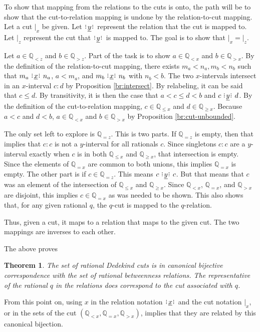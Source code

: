\documentclass[12pt]{article}
\newtheorem{theorem}{Theorem}
\newcommand{\qcut}[2][x]{\ensuremath{\mathbb{Q}_{#2 #1}}}
\newcommand{\qlt}[1][x]{\qcut[#1]{<}}
\newcommand{\qeq}[1][x]{\qcut[#1]{=}}
\newcommand{\qgt}[1][x]{\qcut[#1]{>}}
\newcommand{\qgeq}[1][x]{\qcut[#1]{\geq}}
\newcommand{\qleq}[1][x]{\qcut[#1]{\leq}}
\newcommand{\cut}[1][x]{{\vert}_{#1} }
\newcommand{\yrel}{\xrel[y]}
\begin{document}
To show that mapping from the relations to the cuts is onto, the path will be to show that the cut-to-relation mapping is undone by the relation-to-cut mapping. Let a cut $\cut$ be given. Let $\yrel$ represent the relation that the cut is mapped to. Let $\cut[z]$ represent the cut that $\yrel$ is mapped to. The goal is to show that $\cut = \cut[z]$.  

Let $a \in \qlt[z]$ and $b \in \qgt[z]$. Part of the task is to show $a \in \qlt$ and $b \in \qgt$. By the definition of the relation-to-cut mapping, there exists $m_a < n_a, m_b < n_b$ such that $m_a \xrel n_a$, $a < m_a$, and $m_b \xrel n_b$ with $n_b < b$. The two $x$-intervals intersect in an $x$-interval $c:d$ by  Proposition \ref{br:intersect}. By relabeling, it can be said that $c \leq d$. By transitivity, it is then the case that $a < c \leq d < b$ and $c \yrel d$. By the definition of the cut-to-relation mapping, $c \in \qleq$ and $d \in \qgeq$. Because $a < c$ and $ d < b$, $a \in \qlt$ and $b \in \qgt$ by Proposition \ref{br:cut-unbounded}.

The only set left to explore is $\qeq[z]$. This is two parts. If $\qeq[z]$ is empty, then that implies that $c:c$ is not a $y$-interval for all rationals $c$. Since singletons $c:c$ are a $y$-interval exactly when $c$ is in both $\qleq$ and $\qgeq$, that intersection is empty. Since the elements of $\qeq$ are common to both unions, this implies $\qeq$ is empty. The other part is if $c \in \qeq[z]$. This means $c \yrel c$. But that means that $c$ was an element of the intersection of $\qleq$ and $\qgeq$. Since $\qlt$, $\qeq$, and $\qgt$ are disjoint, this implies $c \in \qeq$ as was needed to be shown. This also shows that, for any given rational $q$, the $q$-cut is mapped to the $q$-relation. 

Thus, given a cut, it maps to a relation that maps to the given cut. The two mappings are inverses to each other.

The above proves 
\begin{theorem}
    The set of rational Dedekind cuts is in canonical bijective correspondence with the set of rational betweenness relations. The representative of the rational $q$ in the relations does correspond to the cut associated with $q$.
\end{theorem}

From this point on, using $x$ in the relation notation $\xrel$ and the cut notation $\cut$, or in the sets of the cut $(\qlt, \qeq, \qgt)$, implies that they are related by this canonical bijection. 
\end{document}
